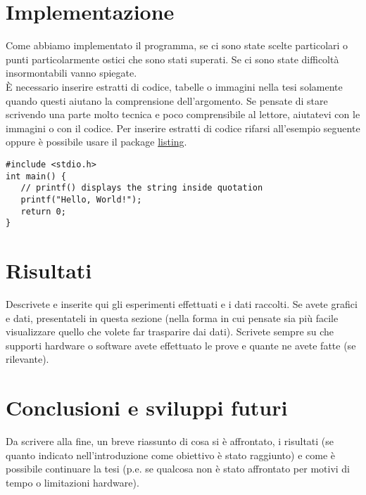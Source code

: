 \documentclass[12pt,a4paper,openright,twoside]{report}
\begin{document}
\chapter{Implementazione}
Come abbiamo implementato il programma, se ci sono state scelte particolari o punti particolarmente ostici che sono stati superati. Se ci sono state difficolt\`a insormontabili vanno spiegate.\\
\`E necessario inserire estratti di codice, tabelle o immagini nella tesi solamente quando questi aiutano la comprensione dell'argomento. Se pensate di stare scrivendo una parte molto tecnica e poco comprensibile al lettore, aiutatevi con le immagini o con il codice. Per inserire estratti di codice rifarsi all'esempio seguente oppure \`e possibile usare il package  \href{https://www.overleaf.com/learn/latex/Code\_listing}{listing}.
\begin{verbatim}
#include <stdio.h>
int main() {
   // printf() displays the string inside quotation
   printf("Hello, World!");
   return 0;
}
\end{verbatim}


\clearpage{\pagestyle{empty}\cleardoublepage}



\chapter{Risultati}
Descrivete e inserite qui gli esperimenti effettuati e i dati raccolti. Se avete grafici e dati, presentateli in questa sezione (nella forma in cui pensate sia pi\`u facile visualizzare quello che volete far trasparire dai dati). Scrivete sempre su che supporti hardware o software avete effettuato le prove e quante ne avete fatte (se rilevante).


\clearpage{\pagestyle{empty}\cleardoublepage}



\chapter{Conclusioni e sviluppi futuri}

Da scrivere alla fine, un breve riassunto di cosa si \`e affrontato, i risultati (se quanto indicato nell'introduzione come obiettivo \`e stato raggiunto) e come \`e possibile continuare la tesi (p.e. se qualcosa non \`e stato affrontato per motivi di tempo o limitazioni hardware).
\end{document}
